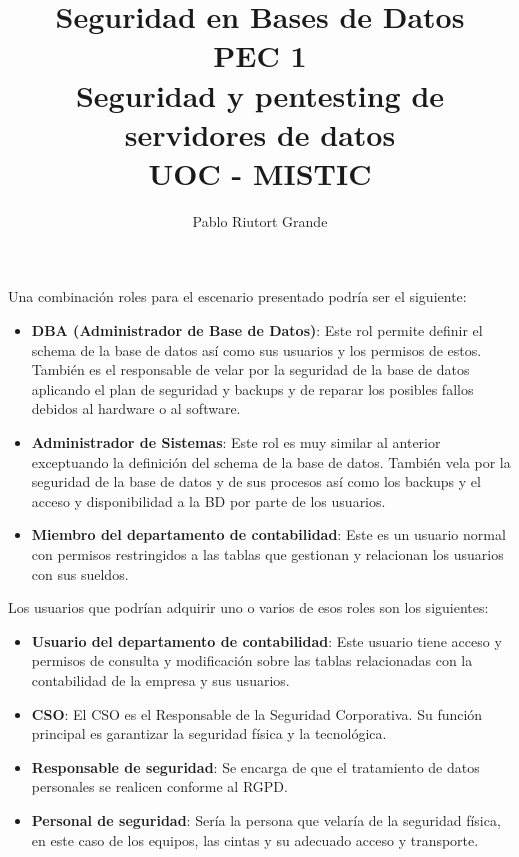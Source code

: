 \documentclass[10pt,a4paper]{article}
\author{Pablo Riutort Grande}
\title{
	Seguridad en Bases de Datos\\
	\vspace{0.5cm}
	PEC 1\\
	\vspace{1cm}
	\textbf{Seguridad y pentesting de servidores de datos}
	\vspace{1cm}\\UOC - MISTIC
}
\begin{document}
\maketitle
\pagebreak

\section{}
\subsection{}
Una combinación roles para el escenario presentado podría ser el siguiente:
\begin{itemize}
\item \textbf{DBA (Administrador de Base de Datos)}: Este rol permite definir el schema de la base de datos así como sus usuarios y los permisos de estos. También es el responsable de velar por la seguridad de la base de datos aplicando el plan de seguridad y backups y de reparar los posibles fallos debidos al hardware o al software.
\item \textbf{Administrador de Sistemas}: Este rol es muy similar al anterior exceptuando la definición del schema de la base de datos. También vela por la seguridad de la base de datos y de sus procesos así como los backups y el acceso y disponibilidad a la BD por parte de los usuarios.
\item \textbf{Miembro del departamento de contabilidad}: Este es un usuario normal con permisos restringidos a las tablas que gestionan y relacionan los usuarios con sus sueldos.
\end{itemize}

Los usuarios que podrían adquirir uno o varios de esos roles son los siguientes:
\begin{itemize}
\item \textbf{Usuario del departamento de contabilidad}: Este usuario tiene acceso y permisos de consulta y modificación sobre las tablas relacionadas con la contabilidad de la empresa y sus usuarios.
\item \textbf{CSO}: El CSO es el Responsable de la Seguridad Corporativa. Su función principal es garantizar la seguridad física y la tecnológica.
\item \textbf{Responsable de seguridad}: Se encarga de que el tratamiento de datos personales se realicen conforme al RGPD.
\item \textbf{Personal de seguridad}: Sería la persona que velaría de la seguridad física, en este caso de los equipos, las cintas y su adecuado acceso y transporte.
\end{itemize}
\end{document}
